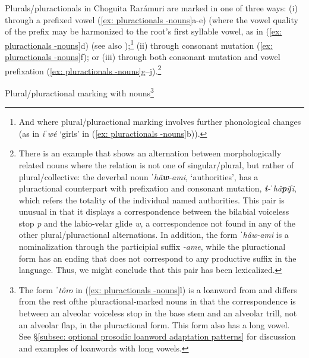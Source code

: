 Plurals/pluractionals in Choguita Rarámuri are marked in one of three ways: (i) through a prefixed vowel (\ref{ex: pluractionals -nouns}a-e) (where the vowel quality of the prefix may be harmonized to the root’s first syllable vowel, as in (\ref{ex: pluractionals -nouns}d) (see also \citealt{lionnet2001elementos});\footnote{And where plural/pluractional marking involves further phonological changes (as in \textit{iˈwé} ‘girls’ in (\ref{ex: pluractionals -nouns}b)).} (ii) through consonant mutation (\ref{ex: pluractionals -nouns}f); or (iii) through both consonant mutation and vowel prefixation (\ref{ex: pluractionals -nouns}g--j).\footnote{There is an example that shows an alternation between morphologically related nouns where the relation is not one of singular/plural, but rather of plural/collective: the deverbal noun \textit{ˈhâ}\textbf{\textit{w}}\textit{-ami}, ‘authorities’, has a pluractional counterpart with prefixation and consonant mutation, \textbf{\textit{i}}\textit{-ˈhâ}\textbf{\textit{p}}\textit{iʃi}, which refers the totality of the individual named authorities. This pair is unusual in that it displays a correspondence between the bilabial voiceless stop \textit{p} and the labio-velar glide \textit{w}, a correspondence not found in any of the other plural/pluractional alternations. In addition, the form \textit{ˈhâw-ami} is a nominalization through the participial suffix \textit{-ame}, while the pluractional form has an ending that does not correspond to any productive suffix in the language. Thus, we might conclude that this pair has been lexicalized.}


\pagebreak

\ea\label{ex: pluractionals -nouns}
{Plural/pluractional marking with nouns}\footnote{The form \textit{ˈtôro} in (\ref{ex: pluractionals -nouns}l) is a loanword from  and differs from the rest ofthe pluractional-marked nouns in that the correspondence is between an alveolar voiceless stop in the base stem and an alveolar trill, not an alveolar flap, in the pluractional form. This form also has a long vowel. See §\ref{subsec: optional prosodic loanword adaptation patterns} for discussion and examples of  loanwords with long vowels.}

